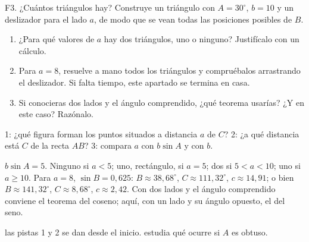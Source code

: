 \begin{tarjeta}{F3. ¿Cuántos triángulos hay?}
 Construye un triángulo con $A=30^\circ$, $b=10$ y un deslizador para el lado $a$, de modo que se vean todas las posiciones posibles de $B$.
\begin{enumerate}[leftmargin=1.5em]
  \item ¿Para qué valores de $a$ hay dos triángulos, uno o ninguno? Justifícalo con un cálculo.
  \item Para $a=8$, resuelve a mano todos los triángulos y compruébalos arrastrando el deslizador. Si falta tiempo, este apartado se termina en casa.
  \item Si conocieras dos lados y el ángulo comprendido, ¿qué teorema usarías? ¿Y en este caso? Razónalo.
\end{enumerate}
 1: ¿qué figura forman los puntos situados a distancia $a$ de $C$? 2: ¿a qué distancia está $C$ de la recta $AB$? 3: compara $a$ con $b\sin A$ y con $b$.

 $b\sin A=5$. Ninguno si $a<5$; uno, rectángulo, si $a=5$; dos si $5<a<10$; uno si $a\ge10$. Para $a=8$, $\sin B=0{,}625$: $B\approx38{,}68^\circ$, $C\approx111{,}32^\circ$, $c\approx14{,}91$; o bien $B\approx141{,}32^\circ$, $C\approx8{,}68^\circ$, $c\approx2{,}42$. Con dos lados y el ángulo comprendido conviene el teorema del coseno; aquí, con un lado y su ángulo opuesto, el del seno.

 las pistas 1 y 2 se dan desde el inicio.  estudia qué ocurre si $A$ es obtuso.
\end{tarjeta}

